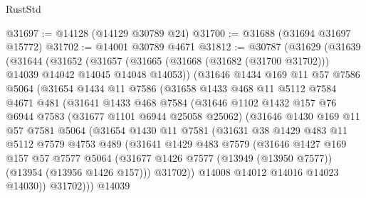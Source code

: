 \begin{lexlean}{RustStd}
\begin{coremodule}
@31697 := @14128 (@14129 @30789 @24)
@31700 := @31688 (@31694 @31697 @15772)
@31702 := @14001 @30789 @4671
@31812 := @30787
    (@31629
      (@31639
        (@31644
          (@31652
            (@31657 (@31665 (@31668 (@31682 (@31700 @31702))) @14039 @14042 @14045 @14048 @14053))
            (@31646
              @1434
              @169
              @11
              @57
              @7586
              @5064
              (@31654
                @1434
                @11
                @7586
                (@31658
                  @1433
                  @468
                  @11
                  @5112
                  @7584
                  @4671
                  @481
                  (@31641
                    @1433
                    @468
                    @7584
                    (@31646
                      @1102
                      @1432
                      @157
                      @76
                      @6944
                      @7583
                      (@31677 @1101 @6944 @25058 @25062)
                      (@31646
                        @1430
                        @169
                        @11
                        @57
                        @7581
                        @5064
                        (@31654
                          @1430
                          @11
                          @7581
                          (@31631
                            @38
                            @1429
                            @483
                            @11
                            @5112
                            @7579
                            @4753
                            @489
                            (@31641
                              @1429
                              @483
                              @7579
                              (@31646
                                @1427
                                @169
                                @157
                                @57
                                @7577
                                @5064
                                (@31677
                                  @1426
                                  @7577
                                  (@13949 (@13950 @7577))
                                  (@13954 (@13956 @1426 @157)))
                                @31702))
                            @14008
                            @14012
                            @14016
                            @14023
                            @14030))
                        @31702)))
                  @14039

\end{coremodule}
\end{lexlean}
